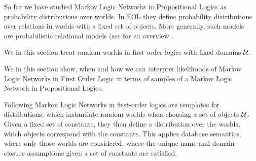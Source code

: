 



So far we have studied Markov Logic Networks in Propositional Logics as probability distributions over worlds.
In FOL they define probability distributions over relations in worlds with a fixed set of objects.
More generally, such models are probabilistic relational models (see for an overview \cite{getoor_introduction_2019}.


We in this section treat random worlds in first-order logics with fixed domains $\mathcal{U}$.

%
We in this section show, when and how we can interpret likelihoods of Markov Logic Networks in First Order Logic in terms of samples of a Markov Logic Network in Propositional Logics.


Following \cite{richardson_markov_2006} Markov Logic Networks in first-order logics are templates for distributions, which instantiate random worlds when choosing a set of objects $\mathcal{U}$.
Given a fixed set of constants, they then define a distribution over the worlds, which objects correspond with the constants. %
This applies database semantics, where only those worlds are considered, where the unique name and domain closure assumptions given a set of constants are satisfied.

